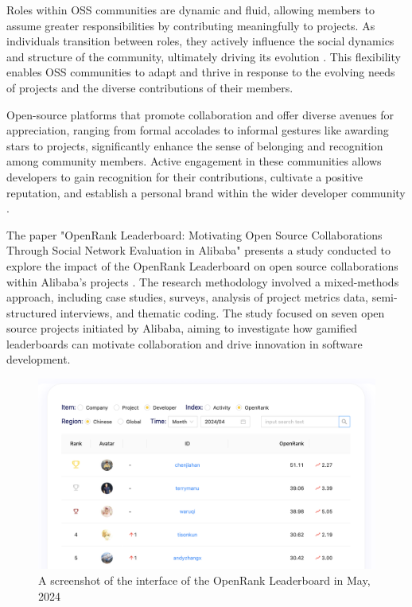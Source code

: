 Roles within OSS communities are dynamic and fluid, allowing members to assume greater responsibilities by contributing meaningfully to projects. As individuals transition between roles, they actively influence the social dynamics and structure of the community, ultimately driving its evolution \citep{06ye2003toward}. This flexibility enables OSS communities to adapt and thrive in response to the evolving needs of projects and the diverse contributions of their members.


Open-source platforms that promote collaboration and offer diverse avenues for appreciation, ranging from formal accolades to informal gestures like awarding stars to projects, significantly enhance the sense of belonging and recognition among community members. Active engagement in these communities allows developers to gain recognition for their contributions, cultivate a positive reputation, and establish a personal brand within the wider developer community \citep{11gerosa2021shifting,13li2012leadership}.

The paper "OpenRank Leaderboard: Motivating Open Source Collaborations Through Social Network Evaluation in Alibaba" presents a study conducted to explore the impact of the OpenRank Leaderboard on open source collaborations within Alibaba's projects \citep{07zhao2024openrank}. The research methodology involved a mixed-methods approach, including case studies, surveys, analysis of project metrics data, semi-structured interviews, and thematic coding. The study focused on seven open source projects initiated by Alibaba, aiming to investigate how gamified leaderboards can motivate collaboration and drive innovation in software development.

\begin{figure}[ht]
    \centering
    \includegraphics[width=0.85\linewidth]{figs/openrank.png}
    \caption{A screenshot of the interface of the OpenRank Leaderboard in May, 2024}
    \label{fig:openrank}
\end{figure}



